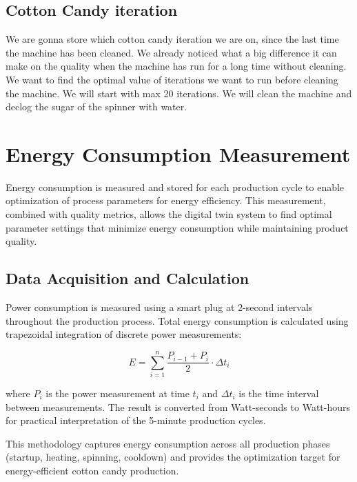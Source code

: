 \subsection{Cotton Candy iteration}
We are gonna store which cotton candy iteration we are on, since the last time the machine has been cleaned. We already noticed what a big difference it can make on the quality when the machine has run for a long time without cleaning. 
We want to find the optimal value of iterations we want to run before cleaning the machine. We will start with max 20 iterations.
We will clean the machine and declog the sugar of the spinner with water.


\section{Energy Consumption Measurement}
\label{sec:energy-measurement}

Energy consumption is measured and stored for each production cycle to enable optimization of process parameters for energy efficiency. This measurement, combined with quality metrics, allows the digital twin system to find optimal parameter settings that minimize energy consumption while maintaining product quality.

\subsection{Data Acquisition and Calculation}

Power consumption is measured using a smart plug at 2-second intervals throughout the production process. Total energy consumption is calculated using trapezoidal integration of discrete power measurements:

\[
E = \sum_{i=1}^{n} \frac{P_{i-1} + P_i}{2} \cdot \Delta t_i
\]

where $P_i$ is the power measurement at time $t_i$ and $\Delta t_i$ is the time interval between measurements. The result is converted from Watt-seconds to Watt-hours for practical interpretation of the 5-minute production cycles.

This methodology captures energy consumption across all production phases (startup, heating, spinning, cooldown) and provides the optimization target for energy-efficient cotton candy production.

